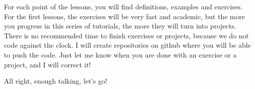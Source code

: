 \documentclass[a4paper,11pt]{article}
\theoremstyle{mytheor}
\begin{document}
\vspace{5mm}

For each point of the lessons, you will find definitions, examples and
exercises.  For the first lessons, the exercises will be very fast and
academic, but the more you progress in this series of tutorials, the
more they will turn into projects.  There is no recommended time to
finish exercises or projects, because we do not code against the
clock. I will create repositories on github where you will be able
to push the code. Just let me know when you are done with an exercise
or a project, and I will correct it!

\vspace{5mm}

All right, enough talking, let's go!

\newpage

\tableofcontents

\newpage


\end{document}
